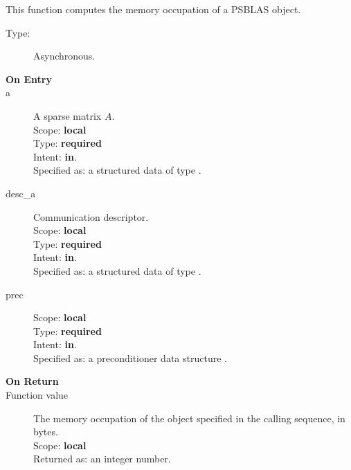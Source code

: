 
This function computes the memory occupation of a PSBLAS object.



\begin{description}
\item[Type:] Asynchronous.
\item[\bf On Entry]
\item[a] A sparse matrix
$A$. \\ 
Scope: {\bf local} \\
Type: {\bf required}\\
Intent: {\bf in}.\\
Specified as: a structured data of type \spdata.
\item[desc\_a] Communication descriptor.\\
Scope: {\bf local} \\
Type: {\bf required}\\
Intent: {\bf in}.\\
Specified as: a structured data of type \descdata.
\item[prec] 
Scope: {\bf local} \\
Type: {\bf required}\\
Intent: {\bf in}.\\
Specified as: a preconditioner data structure \precdata.
\item[\bf On Return] 
\item[Function value] The memory occupation of the object specified in
  the calling sequence, in bytes.\\
Scope: {\bf local} \\
Returned  as: an integer number.
\end{description}




